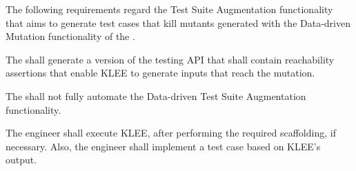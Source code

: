 The following requirements regard the Test Suite Augmentation functionality that aims to generate test cases that kill mutants generated with the Data-driven Mutation functionality of the \FAQAS.

\RQ{} The \FAQAS shall generate a version of the testing API that shall contain reachability assertions that enable KLEE to generate inputs that reach the mutation.

\RQ{} The \FAQAS shall not fully automate the Data-driven Test Suite Augmentation functionality.

\remark The engineer shall execute KLEE, after performing the required scaffolding, if necessary.
Also, the engineer shall implement a test case based on KLEE's output.
